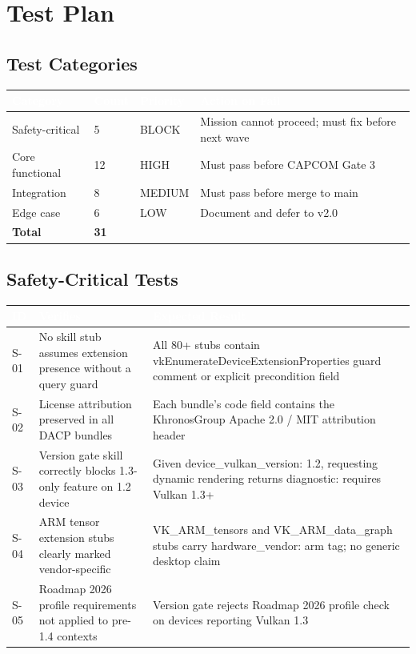 \documentclass[11pt,letterpaper]{article}
\newcommand{\tableheader}[1]{\textbf{\sffamily\textcolor{white}{#1}}}
\begin{document}
\section{Test Plan}

\subsection{Test Categories}

\begin{center}
\begin{tabularx}{\textwidth}{L{3.5cm}C{1.5cm}C{2cm}X}
\toprule
{}
\tableheader{Category} & \tableheader{Count} & \tableheader{Priority} & \tableheader{Action on Fail} \\
\midrule
Safety-critical & 5 & BLOCK & Mission cannot proceed; must fix before next wave \\
Core functional & 12 & HIGH & Must pass before CAPCOM Gate 3 \\
Integration & 8 & MEDIUM & Must pass before merge to main \\
Edge case & 6 & LOW & Document and defer to v2.0 \\
\hline
\textbf{Total} & \textbf{31} & & \\
\bottomrule
\end{tabularx}
\end{center}

\subsection{Safety-Critical Tests}

\begin{center}
\begin{tabularx}{\textwidth}{C{1cm}L{4.5cm}X}
\toprule
{}
\tableheader{ID} & \tableheader{Verifies} & \tableheader{Expected Result} \\
\midrule
S-01 & No skill stub assumes extension presence without a query guard & All 80+ stubs contain vkEnumerateDeviceExtensionProperties guard comment or explicit precondition field \\
S-02 & License attribution preserved in all DACP bundles & Each bundle's code field contains the KhronosGroup Apache 2.0 / MIT attribution header \\
S-03 & Version gate skill correctly blocks 1.3-only feature on 1.2 device & Given device\_vulkan\_version: 1.2, requesting dynamic rendering returns diagnostic: requires Vulkan 1.3+ \\
S-04 & ARM tensor extension stubs clearly marked vendor-specific & VK\_ARM\_tensors and VK\_ARM\_data\_graph stubs carry hardware\_vendor: arm tag; no generic desktop claim \\
S-05 & Roadmap 2026 profile requirements not applied to pre-1.4 contexts & Version gate rejects Roadmap 2026 profile check on devices reporting Vulkan 1.3 \\
\bottomrule
\end{tabularx}
\end{center}
\end{document}
